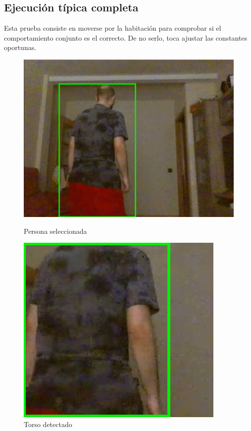 \subsection*{Ejecución típica completa}
Esta prueba consiste en moverse por la habitación para comprobar si el comportamiento conjunto es el correcto. De no serlo, toca ajustar las constantes oportunas.

\begin{figure}[!htb]
    \includegraphics[width=\linewidth]{figures/real/cap1.png}
    \caption{Persona seleccionada}\label{fig:real1}
\endminipage\hfill
{}
    \includegraphics[width=\linewidth]{figures/real/cap2.png}
    \caption{Torso detectado}\label{fig:real2}
\endminipage\hfill
\end{figure}